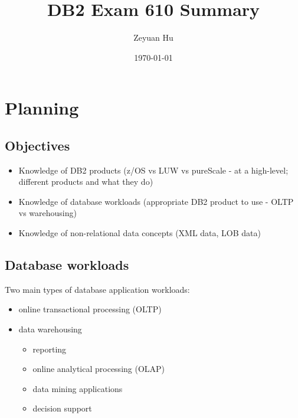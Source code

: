 \documentclass{article}
\title{DB2 Exam 610 Summary}
\author{Zeyuan Hu}
\date{\today}
\begin{document}
\maketitle


\pagebreak
\tableofcontents



\pagebreak

%
%
\section{Planning}
\label{planning}

\subsection{Objectives}
\label{objectives}

\begin{itemize}
\item Knowledge of DB2 products (z/OS vs LUW vs pureScale - at a high-level; different products 
and what they do)
\item Knowledge of database workloads (appropriate DB2 product to use - OLTP vs warehousing)
\item Knowledge of non-relational data concepts (XML data, LOB data)
\end{itemize}

\subsection{Database workloads}
\label{database workloads}

Two main types of database application workloads:
\begin{itemize}
\item online transactional processing (OLTP)
\item data warehousing
\begin{itemize}
\item reporting
\item online analytical processing (OLAP)
\item data mining applications
\item decision support
\end{itemize}
\end{itemize}
\end{document}
